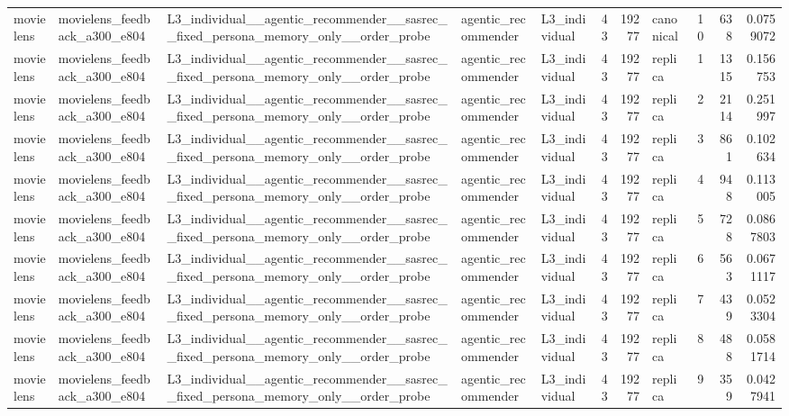 \begin{table}[htbp!]
\begin{tabular}{lllllrrlrrr}
movielens & movielens\_feedback\_a300\_e804 & L3\_individual\_\_agentic\_recommender\_\_sasrec\_\_fixed\_persona\_memory\_only\_\_order\_probe & agentic\_recommender & L3\_individual & 43 & 19277 & canonical & 10 & 638 & 0.0759072 \\
movielens & movielens\_feedback\_a300\_e804 & L3\_individual\_\_agentic\_recommender\_\_sasrec\_\_fixed\_persona\_memory\_only\_\_order\_probe & agentic\_recommender & L3\_individual & 43 & 19277 & replica & 1 & 1315 & 0.156753 \\
movielens & movielens\_feedback\_a300\_e804 & L3\_individual\_\_agentic\_recommender\_\_sasrec\_\_fixed\_persona\_memory\_only\_\_order\_probe & agentic\_recommender & L3\_individual & 43 & 19277 & replica & 2 & 2114 & 0.251997 \\
movielens & movielens\_feedback\_a300\_e804 & L3\_individual\_\_agentic\_recommender\_\_sasrec\_\_fixed\_persona\_memory\_only\_\_order\_probe & agentic\_recommender & L3\_individual & 43 & 19277 & replica & 3 & 861 & 0.102634 \\
movielens & movielens\_feedback\_a300\_e804 & L3\_individual\_\_agentic\_recommender\_\_sasrec\_\_fixed\_persona\_memory\_only\_\_order\_probe & agentic\_recommender & L3\_individual & 43 & 19277 & replica & 4 & 948 & 0.113005 \\
movielens & movielens\_feedback\_a300\_e804 & L3\_individual\_\_agentic\_recommender\_\_sasrec\_\_fixed\_persona\_memory\_only\_\_order\_probe & agentic\_recommender & L3\_individual & 43 & 19277 & replica & 5 & 728 & 0.0867803 \\
movielens & movielens\_feedback\_a300\_e804 & L3\_individual\_\_agentic\_recommender\_\_sasrec\_\_fixed\_persona\_memory\_only\_\_order\_probe & agentic\_recommender & L3\_individual & 43 & 19277 & replica & 6 & 563 & 0.0671117 \\
movielens & movielens\_feedback\_a300\_e804 & L3\_individual\_\_agentic\_recommender\_\_sasrec\_\_fixed\_persona\_memory\_only\_\_order\_probe & agentic\_recommender & L3\_individual & 43 & 19277 & replica & 7 & 439 & 0.0523304 \\
movielens & movielens\_feedback\_a300\_e804 & L3\_individual\_\_agentic\_recommender\_\_sasrec\_\_fixed\_persona\_memory\_only\_\_order\_probe & agentic\_recommender & L3\_individual & 43 & 19277 & replica & 8 & 488 & 0.0581714 \\
movielens & movielens\_feedback\_a300\_e804 & L3\_individual\_\_agentic\_recommender\_\_sasrec\_\_fixed\_persona\_memory\_only\_\_order\_probe & agentic\_recommender & L3\_individual & 43 & 19277 & replica & 9 & 359 & 0.0427941 \\

\end{tabular}
\end{table}
